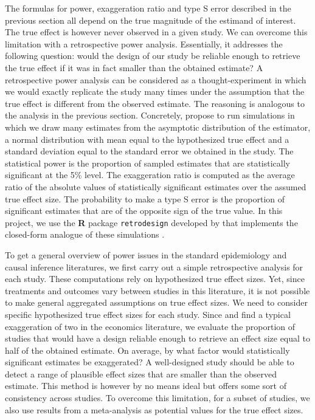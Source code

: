 \documentclass[12pt]{article}
\begin{document}
    The formulas for power, exaggeration ratio and type S error described in the previous section all depend on the true magnitude of the estimand of interest. The true effect is however never observed in a given study.  We can overcome this limitation with a retrospective power analysis. Essentially, it addresses the following question: would the design of our study be reliable enough to retrieve the true effect if it was in fact smaller than the obtained estimate? A retrospective power analysis can be considered as a thought-experiment in which we would exactly replicate the study many times under the assumption that the true effect is different from the observed estimate. The reasoning is analogous to the analysis in the previous section. Concretely, \cite{gelman_beyond_2014} propose to run simulations in which we draw many estimates from the asymptotic distribution of the estimator, a normal distribution with mean equal to the hypothesized true effect and a standard deviation equal to the standard error we obtained in the study. The statistical power is the proportion of sampled estimates that are statistically significant at the 5\% level. The exaggeration ratio is computed as the average ratio of the absolute values of statistically significant estimates over the assumed true effect size. The probability to make a type S error is the proportion of significant estimates that are of the opposite sign of the true value. In this project, we use the \textbf{\textsf{R}} package \texttt{retrodesign} developed by \cite{timm_retrodesign_2019} that implements the closed-form analogue of these simulations \citep{lu_note_2019}.
    
    To get a general overview of power issues in the standard epidemiology and causal inference literatures, we first carry out a simple retrospective analysis for each study. These computations rely on hypothesized true effect sizes. Yet, since treatments and outcomes vary between studies in this literature, it is not possible to make general aggregated assumptions on true effect sizes. We need to consider specific hypothesized true effect sizes for each study. Since \cite{ioannidis_power_2017} and \cite{ferraro_featureis_2020} find a typical exaggeration of two in the economics literature, we evaluate the proportion of studies that would have a design reliable enough to retrieve an effect size equal to half of the obtained estimate. On average, by what factor would statistically significant estimates be exaggerated? A well-designed study should be able to detect a range of plausible effect sizes that are smaller than the observed estimate. This method is however by no means ideal but offers some sort of consistency across studies. To overcome this limitation, for a subset of studies, we also use results from a meta-analysis as potential values for the true effect sizes. 
    
\end{document}
